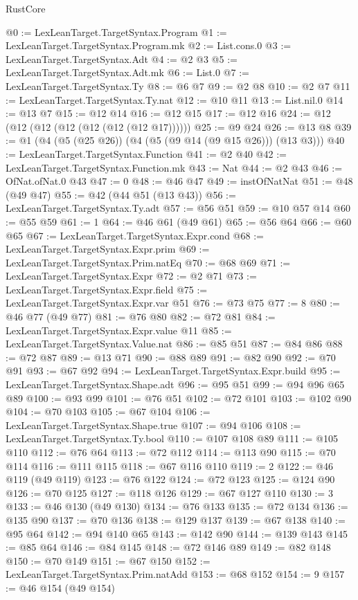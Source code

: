 \begin{lexlean}{RustCore}
\begin{coremodule}
@0 := LexLeanTarget.TargetSyntax.Program
@1 := LexLeanTarget.TargetSyntax.Program.mk
@2 := List.cons.{0}
@3 := LexLeanTarget.TargetSyntax.Adt
@4 := @2 @3
@5 := LexLeanTarget.TargetSyntax.Adt.mk
@6 := List.{0}
@7 := LexLeanTarget.TargetSyntax.Ty
@8 := @6 @7
@9 := @2 @8
@10 := @2 @7
@11 := LexLeanTarget.TargetSyntax.Ty.nat
@12 := @10 @11
@13 := List.nil.{0}
@14 := @13 @7
@15 := @12 @14
@16 := @12 @15
@17 := @12 @16
@24 := @12 (@12 (@12 (@12 (@12 (@12 (@12 @17))))))
@25 := @9 @24
@26 := @13 @8
@39 := @1 (@4 (@5 (@25 @26)) (@4 (@5 (@9 @14 (@9 @15 @26))) (@13 @3)))
@40 := LexLeanTarget.TargetSyntax.Function
@41 := @2 @40
@42 := LexLeanTarget.TargetSyntax.Function.mk
@43 := Nat
@44 := @2 @43
@46 := OfNat.ofNat.{0} @43
@47 := 0
@48 := @46 @47
@49 := instOfNatNat
@51 := @48 (@49 @47)
@55 := @42 (@44 @51 (@13 @43))
@56 := LexLeanTarget.TargetSyntax.Ty.adt
@57 := @56 @51
@59 := @10 @57 @14
@60 := @55 @59
@61 := 1
@64 := @46 @61 (@49 @61)
@65 := @56 @64
@66 := @60 @65
@67 := LexLeanTarget.TargetSyntax.Expr.cond
@68 := LexLeanTarget.TargetSyntax.Expr.prim
@69 := LexLeanTarget.TargetSyntax.Prim.natEq
@70 := @68 @69
@71 := LexLeanTarget.TargetSyntax.Expr
@72 := @2 @71
@73 := LexLeanTarget.TargetSyntax.Expr.field
@75 := LexLeanTarget.TargetSyntax.Expr.var @51
@76 := @73 @75
@77 := 8
@80 := @46 @77 (@49 @77)
@81 := @76 @80
@82 := @72 @81
@84 := LexLeanTarget.TargetSyntax.Expr.value @11
@85 := LexLeanTarget.TargetSyntax.Value.nat
@86 := @85 @51
@87 := @84 @86
@88 := @72 @87
@89 := @13 @71
@90 := @88 @89
@91 := @82 @90
@92 := @70 @91
@93 := @67 @92
@94 := LexLeanTarget.TargetSyntax.Expr.build
@95 := LexLeanTarget.TargetSyntax.Shape.adt
@96 := @95 @51
@99 := @94 @96 @65 @89
@100 := @93 @99
@101 := @76 @51
@102 := @72 @101
@103 := @102 @90
@104 := @70 @103
@105 := @67 @104
@106 := LexLeanTarget.TargetSyntax.Shape.true
@107 := @94 @106
@108 := LexLeanTarget.TargetSyntax.Ty.bool
@110 := @107 @108 @89
@111 := @105 @110
@112 := @76 @64
@113 := @72 @112
@114 := @113 @90
@115 := @70 @114
@116 := @111 @115
@118 := @67 @116 @110
@119 := 2
@122 := @46 @119 (@49 @119)
@123 := @76 @122
@124 := @72 @123
@125 := @124 @90
@126 := @70 @125
@127 := @118 @126
@129 := @67 @127 @110
@130 := 3
@133 := @46 @130 (@49 @130)
@134 := @76 @133
@135 := @72 @134
@136 := @135 @90
@137 := @70 @136
@138 := @129 @137
@139 := @67 @138
@140 := @95 @64
@142 := @94 @140 @65
@143 := @142 @90
@144 := @139 @143
@145 := @85 @64
@146 := @84 @145
@148 := @72 @146 @89
@149 := @82 @148
@150 := @70 @149
@151 := @67 @150
@152 := LexLeanTarget.TargetSyntax.Prim.natAdd
@153 := @68 @152
@154 := 9
@157 := @46 @154 (@49 @154)

\end{coremodule}
\end{lexlean}

